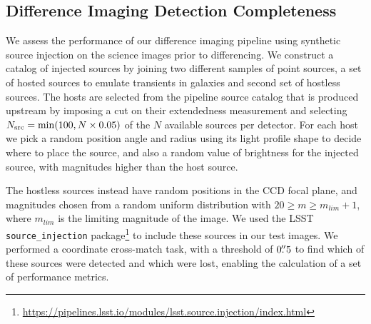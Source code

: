 \subsection{Difference Imaging Detection Completeness} \label{sec:perf:dia_completeness}

We assess the performance of our difference imaging \gls{pipeline} using synthetic source injection on the science images prior to differencing.
We construct a catalog of injected sources by joining two different samples of point sources, a set of hosted sources to emulate transients in galaxies and second set of hostless sources.
The hosts are selected from the pipeline source catalog that is produced upstream by imposing a cut on their extendedness measurement and selecting $N_{\rm src}={\rm min}(100, N\times0.05)$ of the $N$ available sources per detector.
For each host we pick a random position angle and radius using its light profile shape to decide where to place the source, and also a random value of brightness for the injected source, with magnitudes higher than the host source.

The hostless sources instead have random positions in the \gls{CCD} focal plane, and magnitudes chosen 
from a random uniform distribution with $20 \geq m \geq m_{lim} + 1$,  where $m_{lim}$ is the limiting magnitude of the image.
We used the \gls{LSST}  \texttt{source\_injection} package\footnote{\url{https://pipelines.lsst.io/modules/lsst.source.injection/index.html}} to include these sources in our test images.
We performed a coordinate cross-match task, with a threshold of $0\mbox{$.\!\!^{\prime\prime}$}5$ to find which of these sources were detected and which were lost, enabling the calculation of a set of performance metrics.

